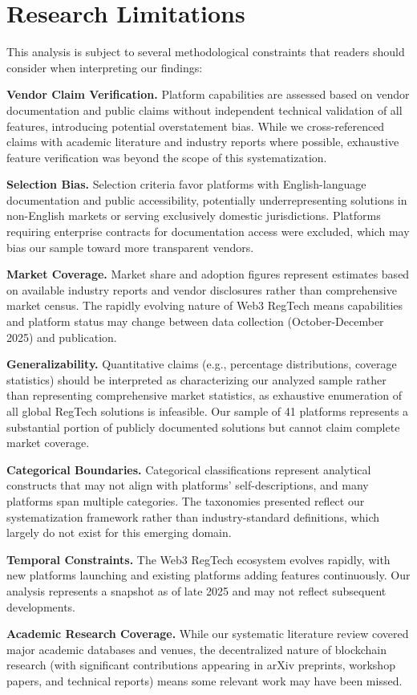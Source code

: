 \documentclass[conference,compsoc]{IEEEtran}
\begin{document}
\section*{Research Limitations}
\label{appendix:limitations}

This analysis is subject to several methodological constraints that readers should consider when interpreting our findings:

\noindent\textbf{Vendor Claim Verification.} Platform capabilities are assessed based on vendor documentation and public claims without independent technical validation of all features, introducing potential overstatement bias. While we cross-referenced claims with academic literature and industry reports where possible, exhaustive feature verification was beyond the scope of this systematization.

\noindent\textbf{Selection Bias.} Selection criteria favor platforms with English-language documentation and public accessibility, potentially underrepresenting solutions in non-English markets or serving exclusively domestic jurisdictions. Platforms requiring enterprise contracts for documentation access were excluded, which may bias our sample toward more transparent vendors.

\noindent\textbf{Market Coverage.} Market share and adoption figures represent estimates based on available industry reports and vendor disclosures rather than comprehensive market census. The rapidly evolving nature of Web3 RegTech means capabilities and platform status may change between data collection (October-December 2025) and publication.

\noindent\textbf{Generalizability.} Quantitative claims (e.g., percentage distributions, coverage statistics) should be interpreted as characterizing our analyzed sample rather than representing comprehensive market statistics, as exhaustive enumeration of all global RegTech solutions is infeasible. Our sample of 41 platforms represents a substantial portion of publicly documented solutions but cannot claim complete market coverage.

\noindent\textbf{Categorical Boundaries.} Categorical classifications represent analytical constructs that may not align with platforms' self-descriptions, and many platforms span multiple categories. The taxonomies presented reflect our systematization framework rather than industry-standard definitions, which largely do not exist for this emerging domain.

\noindent\textbf{Temporal Constraints.} The Web3 RegTech ecosystem evolves rapidly, with new platforms launching and existing platforms adding features continuously. Our analysis represents a snapshot as of late 2025 and may not reflect subsequent developments.

\noindent\textbf{Academic Research Coverage.} While our systematic literature review covered major academic databases and venues, the decentralized nature of blockchain research (with significant contributions appearing in arXiv preprints, workshop papers, and technical reports) means some relevant work may have been missed.

\end{document}
